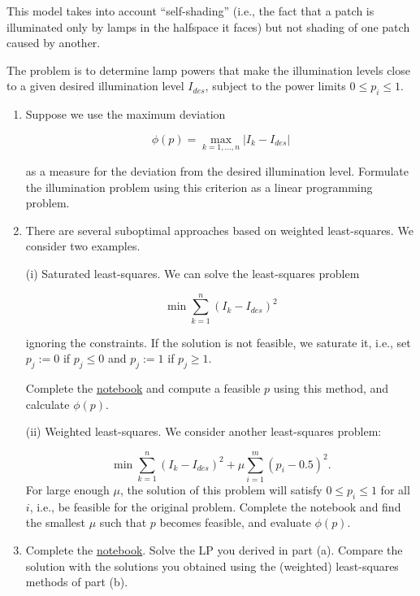\documentclass[
	12pt,
]{fphw}
\begin{document}
This model takes into account “self-shading” (i.e., the fact that a patch is illuminated only by lamps in the halfspace it faces) but not shading of one patch caused by another.

The problem is to determine lamp powers that make the illumination levels close to a given desired illumination level \(I_{des}\), subject to the power limits \(0 \le p_i \le 1\).

\begin{enumerate}
  \item[(a)]  Suppose we use the maximum deviation

\[
\phi(p) = \max_{k=1,\ldots,n} |I_k - I_{des}|
\]

as a measure for the deviation from the desired illumination level. Formulate the illumination problem using this criterion as a linear programming problem.
  
\item[(b)] There are several suboptimal approaches based on weighted least-squares. We consider two examples.

(i) Saturated least-squares. We can solve the least-squares problem

\[
\min \sum_{k=1}^{n} (I_k - I_{des})^2
\]

ignoring the constraints. If the solution is not feasible, we saturate it, i.e., set \(p_j := 0\) if \(p_j \le 0\) and \(p_j := 1\) if \(p_j \ge 1\).

Complete the \href{https://colab.research.google.com/drive/1nqA5k8SXVM8lcAzPEK3Txp4BbbHUiSit?usp=sharing}{notebook} and compute a feasible \(p\) using this method, and calculate \(\phi(p)\).

(ii) Weighted least-squares. We consider another least-squares problem:

\[
\min \sum_{k=1}^{n} (I_k - I_{des})^2 + \mu \sum_{i=1}^{m} (p_i - 0.5)^2.
\]
For large enough $\mu$, the solution of this problem will satisfy $0 \le p_i \le 1$ for all $i$, 
i.e., be feasible for the original problem. Complete the notebook and find the smallest $\mu$ such that $p$
becomes feasible, and evaluate $\phi(p)$.

\item[(c)] Complete the \href{https://colab.research.google.com/drive/1nqA5k8SXVM8lcAzPEK3Txp4BbbHUiSit?usp=sharing}{notebook}. Solve the LP you derived in part (a). Compare the solution with the solutions you
obtained using the (weighted) least-squares methods of part (b).

\end{enumerate}
\end{document}
